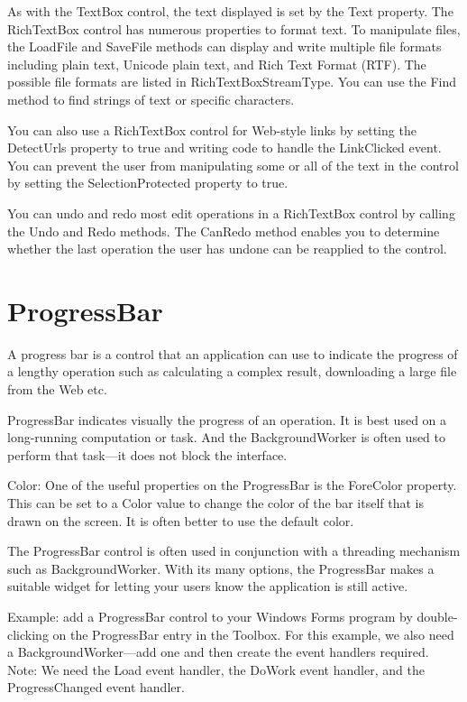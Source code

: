 As with the TextBox control, the text displayed is set by the Text property. The RichTextBox
control has numerous properties to format text. To manipulate files, the LoadFile and SaveFile
methods can display and write multiple file formats including plain text, Unicode plain text, and
Rich Text Format (RTF). The possible file formats are listed in RichTextBoxStreamType. You can
use the Find method to find strings of text or specific characters.

You can also use a RichTextBox control for Web-style links by setting the DetectUrls property to
true and writing code to handle the LinkClicked event. You can prevent the user from
manipulating some or all of the text in the control by setting the SelectionProtected property to
true.

You can undo and redo most edit operations in a RichTextBox control by calling the Undo and
Redo methods. The CanRedo method enables you to determine whether the last operation the user
has undone can be reapplied to the control.



\section{ProgressBar}
A progress bar is a control that an application can use to indicate the progress of a lengthy operation such as calculating a complex result, downloading a large file from the Web etc.

ProgressBar indicates visually the progress of an operation. It is best used on a long-running
computation or task. And the BackgroundWorker is often used to perform that task—it does not
block the interface.

Color: One of the useful properties on the ProgressBar is the ForeColor property. This can be set to
a Color value to change the color of the bar itself that is drawn on the screen. It is often better to use
the default color.

The ProgressBar control is often used in conjunction with a threading mechanism such as
BackgroundWorker. With its many options, the ProgressBar makes a suitable widget for letting your
users know the application is still active.

Example: add a ProgressBar control to your Windows Forms program by double-clicking on
the ProgressBar entry in the Toolbox. For this example, we also need a BackgroundWorker—add
one and then create the event handlers required.
Note: We need the Load event handler, the DoWork event handler, and the ProgressChanged event
handler.



